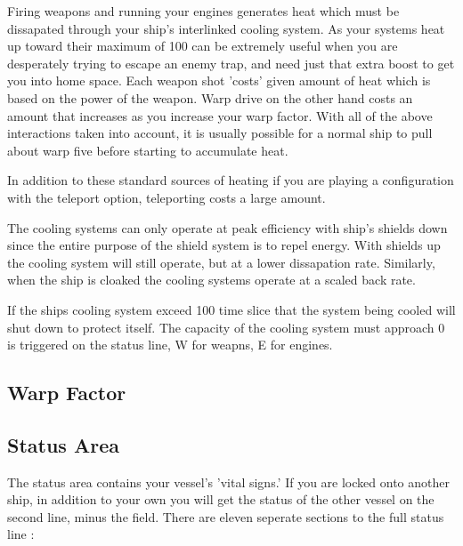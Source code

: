 Firing weapons and running your engines generates heat which must be dissapated through
your ship's interlinked cooling system. As your systems heat up toward their maximum of
100%
can be extremely useful when you are desperately trying to escape an enemy trap, and need
just that extra boost to get you into home space. Each weapon shot 'costs' given amount of
heat which is based on the power of the weapon. Warp drive on the other hand costs an amount
that increases as you increase your warp factor. With all of the above interactions taken into
account, it is usually possible for a normal ship to pull about warp five before starting
to accumulate heat.

In addition to these standard sources of heating if you are playing a configuration with
the teleport option, teleporting costs a large amount.

The cooling systems can only operate at peak efficiency with ship's shields down since the
entire purpose of the shield system is to repel energy. With shields up the cooling system
will still operate, but at a lower dissapation rate. Similarly, when the ship is cloaked the
cooling systems operate at a scaled back rate.

If the ships cooling system exceed 100%
time slice that the system being cooled will shut down to protect itself. The capacity of the
cooling system must approach 0%
is triggered on the status line, W for weapns, E for engines.

\subsection{Warp Factor}






\subsection{Status Area}

The status area contains your vessel's 'vital signs.'
If you are locked onto another ship, in addition to your own you
will get the status of the other vessel on the second line, minus
the  field. There are eleven seperate sections to the
full status line :

